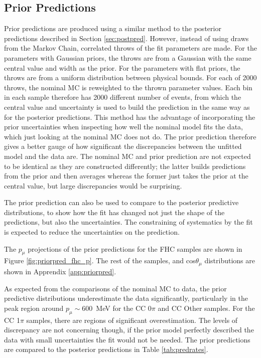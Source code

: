 \subsection{Prior Predictions}

Prior predictions are produced using a similar method to the posterior predictions described in Section \ref{sec:postpred}. However, instead of using draws from the Markov Chain, correlated throws of the fit parameters are made. For the parameters with Gaussian priors, the throws are from a Gaussian with the same central value and width as the prior. For the parameters with flat priors, the throws are from a uniform distribution between physical bounds. For each of 2000 throws, the nominal MC is reweighted to the thrown parameter values. Each bin in each sample therefore has 2000 different number of events, from which the central value and uncertainty is used to build the prediction in the same way as for the posterior predictions. This method has the advantage of incorporating the prior uncertainties when inspecting how well the nominal model fits the data, which just looking at the nominal MC does not do. The prior prediction therefore gives a better gauge of how significant the discrepancies between the unfitted model and the data are. The nominal MC and prior prediction are not expected to be identical as they are constructed differently; the latter builds predictions from the prior and then averages whereas the former just takes the prior at the central value, but large discrepancies would be surprising.

The prior prediction can also be used to compare to the posterior predictive distributions, to show how the fit has changed not just the shape of the predictions, but also the uncertainties. The constraining of systematics by the fit is expected to reduce the uncertainties on the prediction.

The $p_{\mu}$ projections of the prior predictions for the FHC samples are shown in Figure \ref{fig:priorpred_fhc_p}. The rest of the samples, and cos$\theta_{\mu}$ distributions are shown in Apprendix \ref{app:priorpred}.

As expected from the comparisons of the nominal MC to data, the prior predictive distributions underestimate the data significantly, particularly in the peak region around $p_{\mu} \sim$600~MeV for the CC 0$\pi$ and CC Other samples. For the CC 1$\pi$ samples, there are regions of significant overestimation. The levels of discrepancy are not concerning though, if the prior model perfectly described the data with small uncertainties the fit would not be needed. The prior predictions are compared to the posterior predictions in Table \ref{tab:predrates}.

